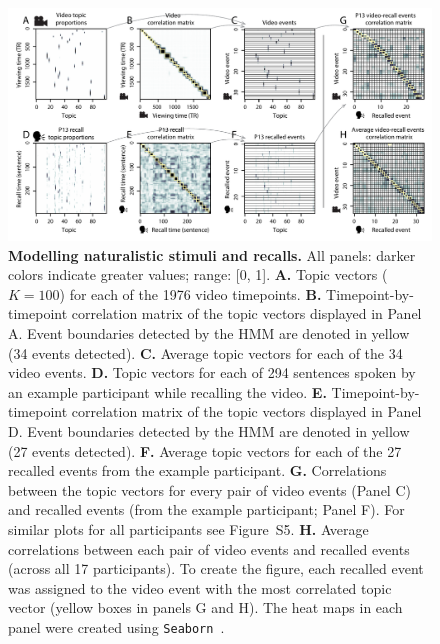 \documentclass{article}
\newcommand{\matchmats}{S5}
\begin{document}
\begin{figure}[tp]
\centering
\includegraphics[width=\textwidth]{figs/eventseg}
\caption{\small \textbf{Modelling naturalistic stimuli and recalls.} All panels: darker colors indicate greater values; range: [0, 1].  \textbf{A.} Topic vectors ($K = 100$) for each of the 1976 video timepoints.  \textbf{B.} Timepoint-by-timepoint correlation matrix of the topic vectors displayed in Panel A.  Event boundaries detected by the HMM are denoted in yellow (34 events detected).  \textbf{C.} Average topic vectors for each of the 34 video events. \textbf{D.} Topic vectors for each of 294 sentences spoken by an example participant while recalling the video.  \textbf{E.} Timepoint-by-timepoint correlation matrix of the topic vectors displayed in Panel D. Event boundaries detected by the HMM are denoted in yellow (27 events detected).  \textbf{F.} Average topic vectors for each of the 27 recalled events from the example participant.  \textbf{G.} Correlations between the topic vectors for every pair of video events (Panel C) and recalled events (from the example participant; Panel F).  For similar plots for all participants see Figure~\matchmats.  \textbf{H.} Average correlations between each pair of video events and recalled events (across all 17 participants).  To create the figure, each recalled event was assigned to the video event with the most correlated topic vector (yellow boxes in panels G and H).  The heat maps in each panel were created using \texttt{Seaborn}~\citep{WaskEtal16}.}
\label{fig:model}
\end{figure}
\end{document}
